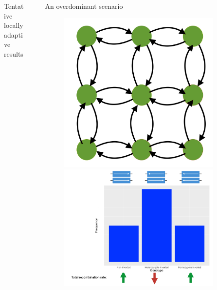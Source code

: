 \documentclass[final]{beamer}
\newlength{\sepwidth}
\newlength{\colwidth}
\newcommand{\separatorcolumn}{\begin{column}{\sepwidth}\end{column}}
\begin{document}
\begin{frame}[t]
\begin{columns}[t]
\begin{column}{\colwidth}
\begin{exampleblock}{Tentative locally adaptive results}
    \end{exampleblock}
    
\end{column}

\separatorcolumn

\begin{column}{\colwidth}

  \begin{block}{An overdominant scenario}

    \begin{figure}
          \begin{minipage}[c]{0.3\textwidth}
            \includegraphics[width=0.9\textwidth]{images/od_populations.jpg}
          \end{minipage}\hfill
          \begin{minipage}[c]{0.67\textwidth}
            \includegraphics[width=0.9\textwidth]{figures/od_theory.png}

\end{minipage}
\end{figure}
\end{block}
\end{column}
\end{columns}
\end{frame}
\end{document}
